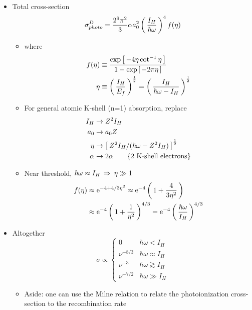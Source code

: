 \documentclass[12pt,letterpaper]{article}
\begin{document}
\begin{Aenumerate}
\begin{itemize}
 \item Total cross-section
 \begin{equation}
 \sigma^D_{photo} = \frac{2^9 \pi^2}{3} \alpha a_0^2 
    \left ( \, \frac{I_H}{\hbar\omega} \, \right )^4 f(\eta)
 \end{equation}
 	\begin{itemize}
	\item where
	\begin{align}
	f(\eta) &\equiv \frac{\exp \left [ \,-4\eta \cot^{-1}\eta \, \right ]}
             {1 - \exp \left [ \, -2\pi\eta \, \right ]} \\
	\eta &\equiv \left ( \, \frac{I_H}{E_f} \, \right )^{\frac{1}{2}} = 
	   \left ( \, \frac{I_H}{\hbar\omega-I_H} \, \right )^{\frac{1}{2}}
	\end{align}
	\item For general atomic K-shell (n=1) absorption, replace
	\begin{align*}
	I_H &\to Z^2 I_H \\
	a_0 &\to a_0 Z \\
	\eta &\to \left [ \, Z^2 I_H / (\hbar\omega - Z^2 I_H) \, \right ]^{\frac{1}{2}} \\
	\alpha &\to 2 \alpha  \quad\quad \{ \text{2 K-shell electrons} \}
	\end{align*}
	\item Near threshold, $\hbar\omega \approx I_H \, \Rightarrow \> \eta \gg 1$
	\begin{align}
	f(\eta) &\approx {\rm e}^{-4 + 4/3\eta^2} \approx {\rm e}^{-4} 
	   \left ( \, 1 + \frac{4}{3\eta^2} \, \right ) \\
	   &\approx {\rm e}^{-4} \left ( \, 1 + \frac{1}{\eta^2} \, \right )^{4/3} =
	   {\rm e}^{-4} \left ( \, \frac{\hbar\omega}{I_H} \, \right )^{4/3}
	\end{align}
	\end{itemize}

 \item Altogether
 \begin{equation}
 \sigma \propto \begin{cases} 0 & \hbar\omega < I_H \\
                             \nu^{-8/3} & \hbar\omega \approx I_H \\
			     \nu^{-3}   & \hbar\omega \gtrsim I_H \\
			     \nu^{-7/2} & \hbar\omega \gg I_H
		\end{cases}
 \end{equation}
 	\begin{itemize}
 	\item Aside: one can use the Milne relation to relate the photoionization
	 cross-section to the recombination rate
 	\end{itemize}


\end{itemize}
\end{Aenumerate}
\end{document}
